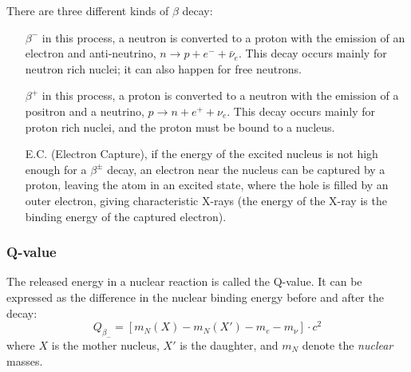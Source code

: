 \documentclass[a4,11pt, notitlepage]{article}
\begin{document}
There are three different kinds of $\beta$ decay:
\begin{itemize}
\item[$\beta^-$] in this process, a neutron is converted to a proton
  with the emission of an electron and anti-neutrino,
  $n\rightarrow p + e^- + \bar \nu_e$. This decay occurs mainly for
  neutron rich nuclei; it can also happen for free neutrons.
\item[$\beta^+$] in this process, a proton is converted to a neutron
  with the emission of a positron and a neutrino,
  $p\rightarrow n + e^+ + \nu_e$. This decay occurs mainly for
  proton rich nuclei, and the proton must be bound to a nucleus.
\item[E.C.] (Electron Capture), if the energy of the excited nucleus is
  not high enough for a $\beta^{\pm}$ decay, an electron near the
  nucleus can be captured by a proton, leaving the atom in an excited
  state, where the hole is filled by an outer electron, giving
  characteristic X-rays (the energy of the X-ray is the binding energy
  of the captured electron).
\end{itemize}

\subsubsection{Q-value}

The released energy in a nuclear reaction is called the Q-value. It can be expressed as the difference in the nuclear binding energy before and after the decay: \begin{equation}
  Q_{\beta_-}=[m_{N}(X)-m_{N}(X')-m_e-m_{\nu}]\cdot c^2
\end{equation}
where $X$ is the mother nucleus, $X'$ is the daughter, and $m_N$
denote the \textit{nuclear} masses. 


%
%
%
\end{document}
